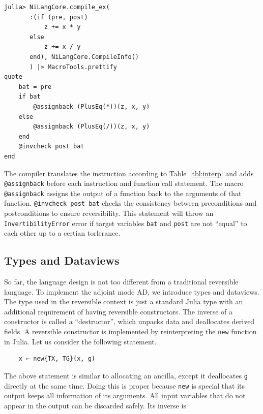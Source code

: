 \documentclass[aps,twocolumn,longbibliography,english,superscriptaddress]{revtex4-1}
\newcommand{\<}{\langle}
\renewcommand{\>}{\rangle}
\newcommand{\Tbl}[1]{Table~\ref{#1}}
\theoremstyle{definition}\newtheorem{definition}{\textit{Definition}}
\begin{document}
\begin{minipage}{.44\textwidth}
\begin{lstlisting}
julia> NiLangCore.compile_ex(
       :(if (pre, post)
           z += x * y
       else
           z += x / y
       end), NiLangCore.CompileInfo()
       ) |> MacroTools.prettify
quote
    bat = pre
    if bat
        @assignback (PlusEq(*))(z, x, y)
    else
        @assignback (PlusEq(/))(z, x, y)
    end
    @invcheck post bat
end
\end{lstlisting}
\end{minipage}

The compiler translates the instruction according to \Tbl{tbl:interp} and adds \texttt{@assignback} before each instruction and function call statement. The macro \texttt{@assignback} assigns the output of a function back to the arguments of that function. \texttt{@invcheck post bat} checks the consistency between preconditions and postconditions to ensure reversibility. This statement will throw an \texttt{InvertibilityError} error if target variables \texttt{bat} and \texttt{post} are not ``equal'' to each other up to a certian torlerance.

\subsection{Types and Dataviews}
So far, the language design is not too different from a traditional reversible language. To implement the adjoint mode AD, we introduce types and dataviews.
The type used in the reversible context is just a standard Julia type with an additional requirement of having reversible constructors.
The inverse of a constructor is called a ``destructor'', which unpacks data and deallocates derived fields.
A reversible constructor is implemented by reinterpreting the \texttt{new} function in Julia.
Let us consider the following statement.

\begin{minipage}{.44\textwidth}
\begin{lstlisting}
    x ← new{TX, TG}(x, g)
\end{lstlisting}
\end{minipage}

The above statement is similar to allocating an ancilla, except it deallocates \texttt{g} directly at the same time.
Doing this is proper because \texttt{new} is special that its output keeps all information of its arguments. All input variables that do not appear in the output can be discarded safely. Its inverse is
\end{document}
